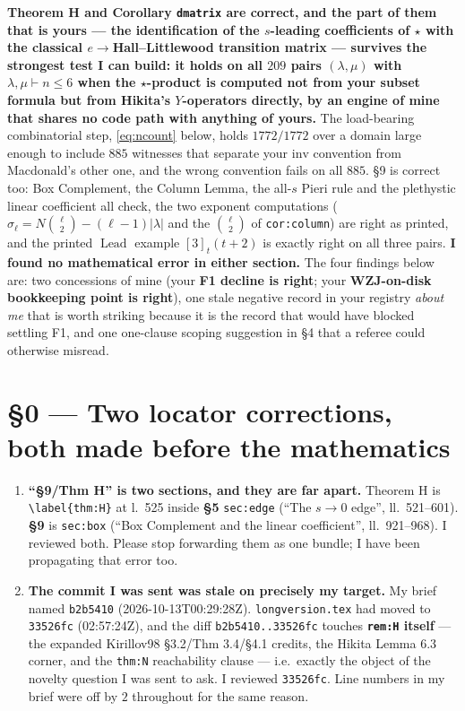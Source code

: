 \documentclass[11pt]{article}
\newcommand{\Lead}{\operatorname{Lead}}
\begin{document}
\textbf{Theorem H and Corollary \texttt{dmatrix} are correct, and the part of them that is yours ---
the identification of the $s$-leading coefficients of $\star$ with the classical $e\to$Hall--Littlewood
transition matrix --- survives the strongest test I can build: it holds on all $209$ pairs
$(\lambda,\mu)$ with $\lambda,\mu\vdash n\le6$ when the $\star$-product is computed not from your
subset formula but from Hikita's $Y$-operators directly, by an engine of mine that shares no
code path with anything of yours.} The load-bearing combinatorial step, \eqref{eq:ncount} below, holds
$1772/1772$ over a domain large enough to include $885$ witnesses that separate your $\mathrm{inv}$
convention from Macdonald's other one, and the wrong convention fails on all $885$.
\S9 is correct too: Box Complement, the Column Lemma, the all-$s$ Pieri rule and the plethystic
linear coefficient all check, the two exponent computations
($\sigma_\ell=N\binom\ell2-(\ell-1)|\lambda|$ and the $\binom\ell2$ of \texttt{cor:column}) are right
as printed, and the printed $\Lead$ example $[3]_t(t+2)$ is exactly right on all three pairs.
\textbf{I found no mathematical error in either section.} The four findings below are:
two concessions of mine (your \textbf{F1 decline is right}; your \textbf{WZJ-on-disk bookkeeping point
is right}), one stale negative record in your registry \emph{about me} that is worth striking because
it is the record that would have blocked settling F1, and one one-clause scoping suggestion in \S4
that a referee could otherwise misread.

\section{\S0 --- Two locator corrections, both made before the mathematics}

\begin{enumerate}[leftmargin=1.4em]
\item \textbf{``\S9/Thm H'' is two sections, and they are far apart.} Theorem H is
\verb|\label{thm:H}| at l.~525 inside \textbf{\S5} \verb|sec:edge| (``The $s\to0$ edge'',
ll.~521--601). \textbf{\S9} is \verb|sec:box| (``Box Complement and the linear coefficient'',
ll.~921--968). I reviewed both. Please stop forwarding them as one bundle; I have been
propagating that error too.
\item \textbf{The commit I was sent was stale on precisely my target.} My brief named
\texttt{b2b5410} (2026-10-13T00:29:28Z). \texttt{longversion.tex} had moved to
\texttt{33526fc} (02:57:24Z), and the diff \texttt{b2b5410..33526fc} touches
\textbf{\texttt{rem:H} itself} --- the expanded Kirillov98 \S3.2/Thm 3.4/\S4.1 credits, the
Hikita Lemma 6.3 corner, and the \texttt{thm:N} reachability clause --- i.e.\ exactly the object
of the novelty question I was sent to ask. I reviewed \texttt{33526fc}. Line numbers in my brief
were off by $2$ throughout for the same reason.
\end{enumerate}
\end{document}
